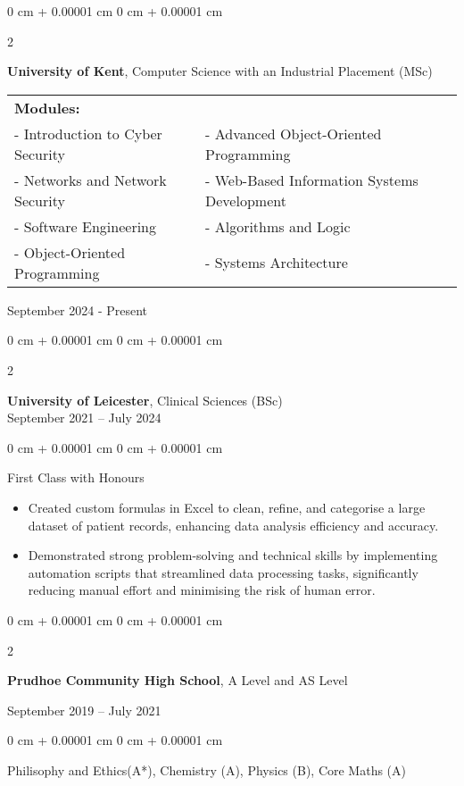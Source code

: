 \documentclass[10pt, letterpaper]{article}
\newenvironment{highlights}{
    \begin{itemize}[
        topsep=0.10 cm,
        parsep=0.10 cm,
        partopsep=0pt,
        itemsep=0pt,
        leftmargin=0 cm + 10pt
    ]
}{
    \end{itemize}
} %
\newenvironment{onecolentry}{
    \begin{adjustwidth}{
        0 cm + 0.00001 cm
    }{
        0 cm + 0.00001 cm
    }
}{
    \end{adjustwidth}
} %
\newenvironment{twocolentry}[2][]{
    \onecolentry
    \def\secondColumn{#2}
    \setcolumnwidth{\fill, 4.5 cm}
    \begin{paracol}{2}
}{
    \switchcolumn \raggedleft \secondColumn
    \end{paracol}
    \endonecolentry
} %
\begin{document}
\begin{twocolentry}{ 
   September 2024 - Present 
}
    \textbf{University of Kent}, Computer Science with an Industrial Placement (MSc) 
    \vspace{0.05 cm}
    \begin{tabular}{@{}>{\raggedright\arraybackslash}p{8cm}@{} >{\raggedright\arraybackslash}p{8cm}@{}}
        \textbf{Modules:} & \textbf{} \\
        - Introduction to Cyber Security & - Advanced Object-Oriented Programming \\
       - Networks and Network Security & - Web-Based Information Systems Development \\
        - Software Engineering & - Algorithms and Logic \\
        - Object-Oriented Programming & - Systems Architecture \\
    \end{tabular}
\end{twocolentry}


       \begin{twocolentry}{
    September 2021 – July 2024
}
 \textbf{University of Leicester}, Clinical Sciences (BSc) \\
\end{twocolentry}
\vspace{-0.15 cm} %
\begin{onecolentry}
    \begin{highlights}
        {First Class with Honours}
    \end{highlights}
     \vspace{-0.15cm}
    \begin{itemize}[leftmargin=*, itemsep=0.1em] %
        \item Created custom formulas in Excel to clean, refine, and categorise a large dataset of patient records, enhancing data analysis efficiency and accuracy.
        \item Demonstrated strong problem-solving and technical skills by implementing automation scripts that streamlined data processing tasks, significantly reducing manual effort and minimising the risk of human error.
    \end{itemize}
\end{onecolentry}

\vspace{0.2 cm}
    \begin{twocolentry}{
    September 2019 – July 2021
}
    \textbf{Prudhoe Community High School}, A Level and AS Level  
\end{twocolentry}
\vspace{-0.15 cm} %
\begin{onecolentry}
    \begin{highlights}
        {Philisophy and Ethics(A*), Chemistry (A), Physics (B), Core Maths (A)}
    \end{highlights}
\end{onecolentry}
\end{document}
